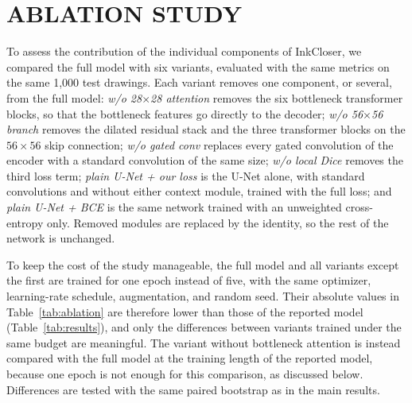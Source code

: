 \documentclass{IEEEcsmag}
\begin{document}
\section{ABLATION STUDY}

To assess the contribution of the individual components of InkCloser, we compared
the full model with six variants, evaluated with the same metrics on the same 1,000
test drawings. Each variant removes one component, or several, from the full model:
\emph{w/o 28$\times$28 attention} removes the six bottleneck transformer blocks, so
that the bottleneck features go directly to the decoder; \emph{w/o 56$\times$56
branch} removes the dilated residual stack and the three transformer blocks on the
$56\times 56$ skip connection; \emph{w/o gated conv} replaces every gated
convolution of the encoder with a standard convolution of the same size;
\emph{w/o local Dice} removes the third loss term; \emph{plain U-Net + our loss} is
the U-Net alone, with standard convolutions and without either context module,
trained with the full loss; and \emph{plain U-Net + BCE} is the same network trained
with an unweighted cross-entropy only. Removed modules are replaced by the identity,
so the rest of the network is unchanged.

To keep the cost of the study manageable, the full model and all variants except
the first are trained for one epoch instead of five, with the same optimizer,
learning-rate schedule, augmentation, and random seed. Their absolute values in
Table~\ref{tab:ablation} are therefore lower than those of the reported model
(Table~\ref{tab:results}), and only the differences between variants trained under
the same budget are meaningful. The variant without bottleneck attention is instead
compared with the full model at the training length of the reported model, because
one epoch is not enough for this comparison, as discussed below. Differences are
tested with the same paired bootstrap as in the main results.
\end{document}
